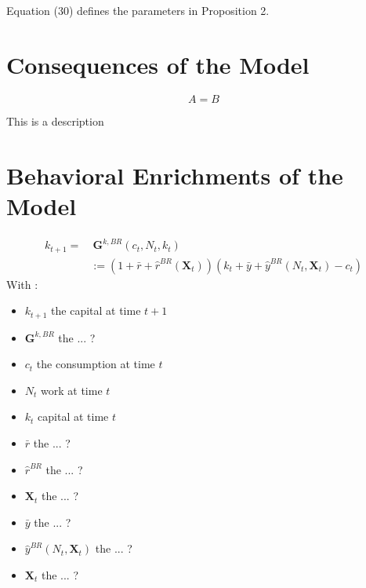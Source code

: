 \documentclass{article}
\begin{document}
Equation (30) defines the parameters in Proposition 2.

\section{Consequences of the Model}

\begin{equation}
    A = B
\end{equation}

This is a description

\section{Behavioral Enrichments of the Model}

\begin{equation} \tag{49}
    \begin{split}
        k_{t+1}= &\  \textbf{G}^{k,BR}(c_{t},N_{t},k_{t}) \\
        & := (1+\bar{r}+\hat{r}^{BR}(\textbf{X}_t))(k_{t}+\bar{y}+\hat{y}^{BR}(N_{t},\textbf{X}_t)-c_{t})
    \end{split}
\end{equation}
With : 
\begin{itemize}
    \item $k_{t+1}$ the capital at time $t+1$
    \item $\textbf{G}^{k,BR}$ the ... ?
    \item $c_t$ the consumption at time $t$
    \item $N_{t}$ work at time $t$
    \item $k_t$ capital at time $t$
    \item $\bar{r}$ the ... ?
    \item $\hat{r}^{BR}$ the ... ?
    \item $\textbf{X}_t$ the ... ?
    \item $\bar{y}$ the ... ?
    \item $\hat{y}^{BR}(N_t,\textbf{X}_{t})$ the ... ?
    \item $\textbf{X}_{t}$ the ... ?  
\end{itemize}
\end{document}

